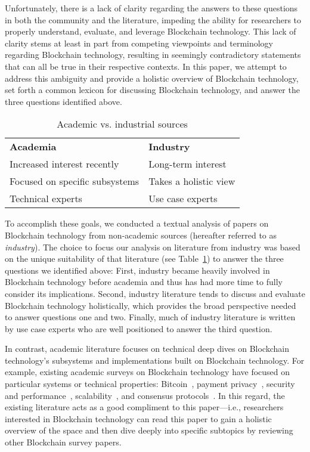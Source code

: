 Unfortunately, there is a lack of clarity regarding the answers to these questions in both the community and the literature, impeding the ability for researchers to properly understand, evaluate, and leverage Blockchain technology.
This lack of clarity stems at least in part from competing viewpoints and terminology regarding Blockchain technology, resulting in seemingly contradictory statements that can all be true in their respective contexts.
In this paper, we attempt to address this ambiguity and provide a holistic overview of Blockchain technology, set forth a common lexicon for discussing Blockchain technology, and answer the three questions identified above.

\begin{table}
	\centering
	
	\begin{tabular}{l|l}
		\textbf{Academia} & \textbf{Industry} \\

		Increased interest recently & Long-term interest \\
		Focused on specific subsystems & Takes a holistic view \\
		Technical experts & Use case experts \\ \hline
	\end{tabular}
	
	\caption{Academic vs. industrial sources}
	\label{tab:sources}
\end{table}

To accomplish these goals, we conducted a textual analysis of papers on Blockchain technology from non-academic sources (hereafter referred to as \emph{industry}).
The choice to focus our analysis on literature from industry was based on the unique suitability of that literature (see Table~\ref{tab:sources}) to answer the three questions we identified above:
First, industry became heavily involved in Blockchain technology before academia and thus has had more time to fully consider its implications.
Second, industry literature tends to discuss and evaluate Blockchain technology holistically, which provides the broad perspective needed to answer questions one and two.
Finally, much of industry literature is written by use case experts who are well positioned to answer the third question.

In contrast, academic literature focuses on technical deep dives on Blockchain technology's subsystems and implementations built on Blockchain technology.
For example, existing academic surveys on Blockchain technology have focused on particular systems or technical properties: Bitcoin~\cite{BMC+15,Narayanan17}, payment privacy~\cite{Conti17}, security and performance~\cite{Gervais16}, scalability~\cite{Croman16}, and consensus protocols~\cite{Bano17,garay2018consensus}.
In this regard, the existing literature acts as a good compliment to this paper---i.e., researchers interested in Blockchain technology can read this paper to gain a holistic overview of the space and then dive deeply into specific subtopics by reviewing other Blockchain survey papers.

